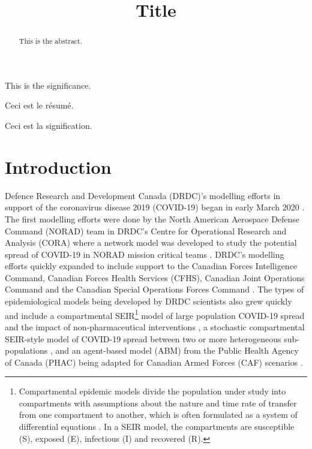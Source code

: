 \documentclass[sr]{drdc-report}
\title{Title}
\begin{document}
 \makefrontcover

 \begin{abstract}
This is the abstract.
 \end{abstract}

 \begin{significance}
This is the significance.
 \end{significance}

 \begin{fabstract}
Ceci est le r\'esum\'e.
 \end{fabstract}

 \begin{fsignificance}
Ceci est la signification.

 \end{fsignificance}

 \tableofcontents\clearpage
 \listoffigures
 \listoftables


\section{Introduction} 

 

Defence Research and Development Canada (DRDC)’s modelling efforts in support of the coronavirus disease 2019 (COVID-19) began in early March 2020 \cite{Waller}. The first modelling efforts were done by the North American Aerospace Defense Command (NORAD) team in DRDC’s Centre for Operational Research and Analysis (CORA) where a network model was developed to study the potential spread of COVID-19 in NORAD mission critical teams \cite{MirshakCazzolato}. DRDC’s modelling efforts quickly expanded to include support to the Canadian Forces Intelligence Command, Canadian Forces Health Services (CFHS), Canadian Joint Operations Command and the Canadian Special Operations Forces Command \cite{Waller}. The types of epidemiological models being developed by DRDC scientists also grew quickly and include a compartmental SEIR{\footnote{Compartmental epidemic models divide the population under study into compartments with assumptions about the nature and time rate of transfer from one compartment to another, which is often formulated as a system of differential equations \cite{Brauer}. In a SEIR model, the compartments are susceptible (S), exposed (E), infectious (I) and recovered (R).}} model of large population COVID-19 spread and the impact of non-pharmaceutical interventions{\footnotemark}  \cite{Beech}, a stochastic compartmental SEIR-style model of COVID-19 spread between two or more heterogeneous sub-populations \cite{Hoogen}, and an agent-based model (ABM) from the Public Health Agency of Canada (PHAC) being adapted for Canadian Armed Forces (CAF) scenarios \cite{MirshakPearce}.  
\end{document}

